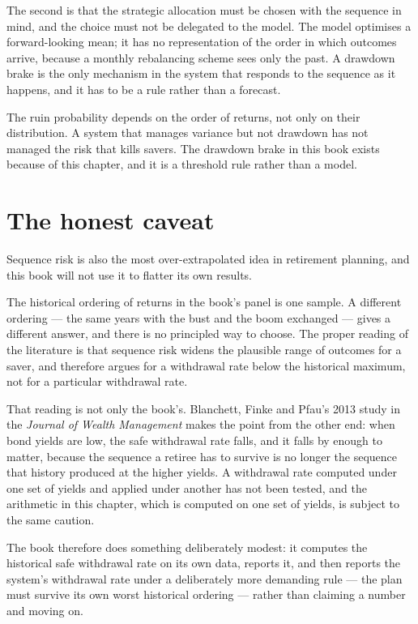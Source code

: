 The second is that the strategic allocation must be chosen with the
sequence in mind, and the choice must not be delegated to the model. The
model optimises a forward-looking mean; it has no representation of the
order in which outcomes arrive, because a monthly rebalancing scheme sees
only the past. A drawdown brake is the only mechanism in the system that
responds to the sequence as it happens, and it has to be a rule rather than
a forecast.

\begin{takeaway}
The ruin probability depends on the order of returns, not only on their
distribution. A system that manages variance but not drawdown has not
managed the risk that kills savers. The drawdown brake in this book exists
because of this chapter, and it is a threshold rule rather than a model.
\end{takeaway}

\section{The honest caveat}

Sequence risk is also the most over-extrapolated idea in retirement
planning, and this book will not use it to flatter its own results.

The historical ordering of returns in the book's panel is one sample. A
different ordering --- the same years with the bust and the boom
exchanged --- gives a different answer, and there is no principled way to
choose. The proper reading of the literature is that sequence risk widens
the plausible range of outcomes for a saver, and therefore argues for a
withdrawal rate below the historical maximum, not for a particular
withdrawal rate.

That reading is not only the book's. Blanchett, Finke and Pfau's 2013
study in the \emph{Journal of Wealth Management} makes the point from the
other end: when bond yields are low, the safe withdrawal rate falls, and
it falls by enough to matter, because the sequence a retiree has to
survive is no longer the sequence that history produced at the higher
yields. A withdrawal rate computed under one set of yields and applied
under another has not been tested, and the arithmetic in this chapter,
which is computed on one set of yields, is subject to the same caution.

The book therefore does something deliberately modest: it computes the
historical safe withdrawal rate on its own data, reports it, and then
reports the system's withdrawal rate under a deliberately more demanding
rule --- the plan must survive its own worst historical ordering --- rather
than claiming a number and moving on.

